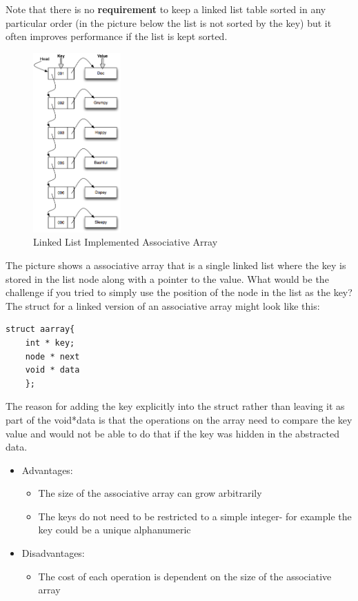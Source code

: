 Note that there is no \textbf{requirement} to keep a linked list table sorted in any particular order (in the picture below the list is not sorted by the key) but it often improves performance if the list is kept sorted.

\begin{figure}[H]
\centering
\includegraphics[width=0.3\textwidth]{pictures/image006.png}
\caption{Linked List Implemented Associative Array}
\label{fig:aa3}
\end{figure}

The picture shows a associative array that is a single linked list where the key is stored in the list node along with a pointer to the value. What would be the challenge if you tried to simply use the position of the node in the list as the key? \newline
The struct for a linked version of an associative array might look like this:

\begin{lstlisting}
struct aarray{
    int * key;
    node * next
    void * data
    };
\end{lstlisting}

The reason for adding the key explicitly into the struct rather than leaving it as part of the void*data is that the operations on the array need to compare the key value and would not be able to do that if the key was hidden in the abstracted data.

\begin{itemize}
\item Advantages:
\begin{itemize}
	\item The size of the associative array can grow arbitrarily
	\item The keys do not need to be restricted to a simple integer- for example the key could be a unique alphanumeric
\end{itemize}

\item Disadvantages:
\begin{itemize}
	\item The cost of each operation is dependent on the size of the associative array
\end{itemize}
\end{itemize}

